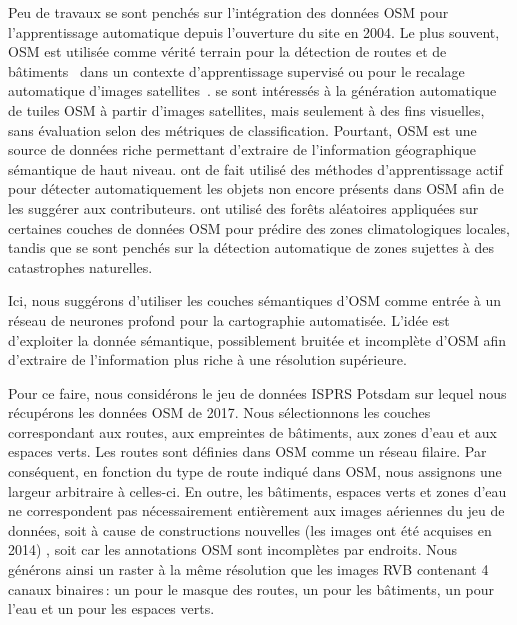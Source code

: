 Peu de travaux se sont penchés sur l'intégration des données \gls{OSM} pour l'apprentissage automatique depuis l'ouverture du site en 2004. Le plus souvent, \gls{OSM} est utilisée comme vérité terrain pour la détection de routes et de bâtiments~\cite{mnih_machine_2013,maggiori_learning_2017} dans un contexte d'apprentissage supervisé ou pour le recalage automatique d'images satellites~\cite{vakalopoulou_simultaneous_2016}. \citet{isola_image--image_2016} se sont intéressés à la génération automatique de tuiles \gls{OSM} à partir d'images satellites, mais seulement à des fins visuelles, sans évaluation selon des métriques de classification. Pourtant, \gls{OSM} est une source de données riche permettant d'extraire de l'information géographique sémantique de haut niveau.
\citet{chen_deepvgi_2017} ont de fait utilisé des méthodes d'apprentissage actif pour détecter automatiquement les objets non encore présents dans \gls{OSM} afin de les suggérer aux contributeurs. \citet{danylo_contributing_2016} ont utilisé des forêts aléatoires appliquées sur certaines couches de données \gls{OSM} pour prédire des zones climatologiques locales, tandis que \citet{geis_joint_2017} se sont penchés sur la détection automatique de zones sujettes à des catastrophes naturelles.

Ici, nous suggérons d'utiliser les couches sémantiques d'\gls{OSM} comme entrée à un réseau de neurones profond pour la cartographie automatisée. L'idée est d'exploiter la donnée sémantique, possiblement bruitée et incomplète d'\gls{OSM} afin d'extraire de l'information plus riche à une résolution supérieure.

Pour ce faire, nous considérons le jeu de données \gls{ISPRS} Potsdam sur lequel nous récupérons les données \gls{OSM} de 2017. Nous sélectionnons les couches correspondant aux routes, aux empreintes de bâtiments, aux zones d'eau et aux espaces verts. Les routes sont définies dans \gls{OSM} comme un réseau filaire. Par conséquent, en fonction du type de route indiqué dans \gls{OSM}, nous assignons une largeur arbitraire à celles-ci. En outre, les bâtiments, espaces verts et zones d'eau ne correspondent pas nécessairement entièrement aux images aériennes du jeu de données, soit à cause de constructions nouvelles (les images ont été acquises en 2014) , soit car les annotations \gls{OSM} sont incomplètes par endroits. Nous générons ainsi un raster à la même résolution que les images \gls{RVB} contenant 4 canaux binaires\,: un pour le masque des routes, un pour les bâtiments, un pour l'eau et un pour les espaces verts.

